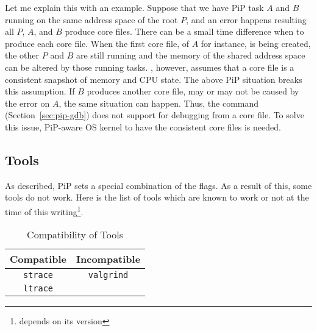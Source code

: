 Let me explain this with an example. Suppose that we have PiP task $A$
and $B$ running on the same address space of the root $P$, and an
error happens resulting all $P$, $A$, and $B$ produce core
files. There can be a small time difference when to produce each core
file. When the first core file, of $A$ for instance, is being created,
the other $P$ and $B$ are still running and the memory of the shared 
address space can be altered by those running tasks.
, however, assumes that a core file is a consistent snapshot
of memory and CPU state. The above PiP situation breaks this
assumption. If $B$ produces another core file, may or may not be
caused by the error on $A$, the same situation can happen.
Thus, the  command (Section~\ref{sec:pip-gdb}) does
not support for debugging from a core file. To solve this issue,
PiP-aware OS kernel to have the consistent core files is needed. 

\subsection{Tools}

As described, PiP sets a special combination of the 
flags. As a result of this, some tools do not work. Here is the list
of tools which are known to work or not at the time of this
writing\footnote{ depends on its version}. 

\begin{table}[ht]
  \centering
  \caption{Compatibility of Tools}
  \vspace{3mm}
  \begin{tabular}{c|c}
    \hline
    Compatible & Incompatible \\
    \hline
        {\tt strace} & {\tt valgrind} \\
        {\tt ltrace} \\
        \hline
  \end{tabular}
\end{table}
